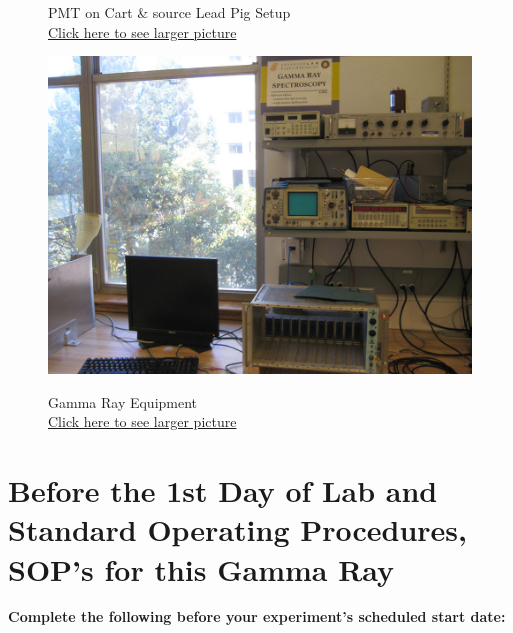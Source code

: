 \documentclass{../lab}
\begin{document}
\begin{figure}[H]
  \caption{PMT on Cart \& source Lead Pig Setup \\
  \href{http://experimentationlab.berkeley.edu/sites/default/files/images/GMA_PMT_3519-Lg.jpg}{Click here to see larger picture}}
  \label{fig:PMT}
\endminipage\hfill
{}
  \href{http://experimentationlab.berkeley.edu/sites/default/files/images/GMA_Equip_3518-Lg.jpg}{\includegraphics[width=\linewidth,keepaspectratio]{images/GMA_Equip_3518-Lg.jpg}}
  \caption{Gamma Ray Equipment \\ \href{http://experimentationlab.berkeley.edu/sites/default/files/images/GMA_Equip_3518-Lg.jpg}{Click here to see larger picture}}\label{fig:Equipment}
\endminipage
\end{figure}

\section{Before the 1st Day of Lab and Standard Operating Procedures, SOP's for this Gamma Ray}

\noindent\textbf{Complete the following before your experiment's scheduled start date:}
\end{document}
